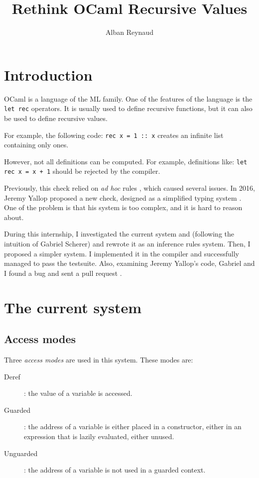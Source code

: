 \documentclass{article}
\title{Rethink OCaml Recursive Values}
\author{Alban Reynaud}
\date{}
\begin{document}
\maketitle

\section{Introduction}
OCaml is a language of the ML family. One of the features of the language is the
\lstinline|let rec| operators. It is usually used to define recursive
functions, but it can also be used to define recursive values.

For example, the following code: \lstinline|rec x = 1 :: x| creates an infinite
list containing only ones.

However, not all definitions can be computed. For example, definitions like:
\lstinline|let rec x = x + 1| should be rejected by the compiler.

Previously, this check relied on \textit{ad hoc} rules \cite{PreviousRules},
which caused several issues. In 2016, Jeremy Yallop proposed a new check,
designed as a simplified typing system \cite{Yallop}. One of the problem is that
his system is too complex, and it is hard to reason about.

During this internship, I investigated the current system and (following the
intuition of Gabriel Scherer) and rewrote it as an inference rules system. Then,
I proposed a simpler system. I implemented it in the compiler and successfully
managed to pass the testsuite. Also, examining Jeremy Yallop's code, Gabriel and
I found a bug and sent a pull request \cite{PullRequest}.

\section{The current system}

\subsection{Access modes}
Three \textit{access modes} are used in this system. These modes are:
\begin{description}
  \item[Deref] : the value of a variable is accessed.
  \item[Guarded] : the address of a variable is either placed in a constructor,
    either in an expression that is lazily evaluated, either unused.
  \item[Unguarded] : the address of a variable is not used in a guarded
    context.
\end{description}
\end{document}
